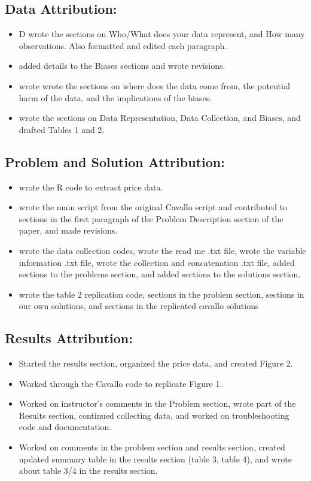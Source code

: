 \subsection{Data Attribution:}
\begin{itemize}
   \item {} D wrote the sections on Who/What does your data represent, and How many observations. Also formatted and edited each paragraph.
   \item {} added details to the Biases sections and wrote revisions.
   \item {} wrote wrote the sections on where does the data come from, the potential harm of the data, and the implications of the biases.
   \item {} wrote the sections on Data Representation, Data Collection, and Biases, and drafted Tables 1 and 2.
\end{itemize}

\subsection{Problem and Solution Attribution:}
\begin{itemize}
   \item {} wrote the R code to extract price data.
   \item {} wrote the main script from the original Cavallo script and contributed to sections in the first paragraph of the Problem Description section of the paper, and made revisions.
   \item {} wrote the data collection codes, wrote the read me .txt file, wrote the variable information .txt file, wrote the collection and concatenation .txt file, added sections to the problems section, and added sections to the solutions section.
   \item {} wrote the table 2 replication code, sections in the problem section, sections in our own solutions, and  sections in the replicated cavallo solutions 
\end{itemize}

\subsection{Results Attribution:}
\begin{itemize}
   \item {} Started the results section, organized the price data, and created Figure 2. 
   \item {} Worked through the Cavallo code to replicate Figure 1. 
   \item {} Worked on instructor's comments in the Problem section, wrote part of the Results section, continued collecting data, and worked on troubleshooting code and documentation.
   \item {} Worked on comments in the problem section and results section, created updated summary table in the results section (table 3, table 4), and wrote about table 3/4 in the results section.
\end{itemize}

